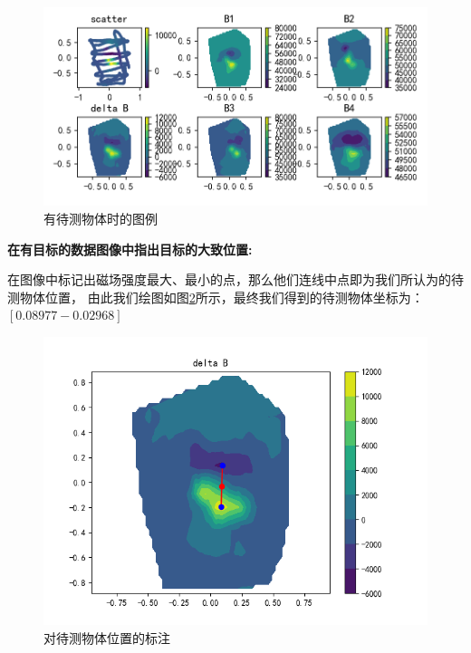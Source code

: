 \documentclass[UTF8]{ctexart}
\begin{document}
\begin{figure}[h]
    \centering
    \includegraphics[scale=0.7]{with_item.png}
    \caption{有待测物体时的图例}
    \label{fig:with_item}
\end{figure}

\noindent \textbf{在有目标的数据图像中指出目标的大致位置:}

在图像中标记出磁场强度最大、最小的点，那么他们连线中点即为我们所认为的待测物体位置，
由此我们绘图如图\ref{fig:item}所示，最终我们得到的待测物体坐标为： $[0.08977 -0.02968]$

\begin{figure}[h]
    \centering
    \includegraphics[scale=0.7]{delta B2.png}
    \caption{对待测物体位置的标注}
    \label{fig:item}
\end{figure}
\end{document}
